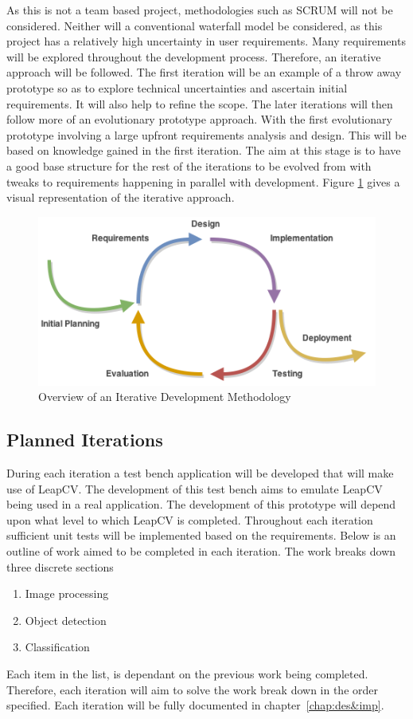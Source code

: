 \documentclass[11pt,oneside]{report}
\begin{document}
					As this is not a team based project, methodologies such as SCRUM will not be considered.
					Neither will a conventional waterfall model be considered, as this project has a relatively high uncertainty in user requirements.
					Many requirements will be explored throughout the development process.
					Therefore, an iterative approach will be followed.
					The first iteration will be an example of a throw away prototype so as to explore technical uncertainties and ascertain initial requirements.
					It will also help to refine the scope.
					The later iterations will then follow more of an evolutionary prototype approach.
					With the first evolutionary prototype involving a large upfront requirements analysis and design.
					This will be based on knowledge gained in the first iteration.
					The aim at this stage is to have a good base structure for the rest of the iterations to be evolved from with tweaks to requirements happening in parallel with development.
					Figure \ref{fig:iterative} gives a visual representation of the iterative approach.
					\begin{figure}[!h]
						\centering
					
    						\includegraphics[width=\textwidth]{iterative_development}
    						\caption{Overview of an Iterative Development Methodology {\label{fig:iterative}}}
					\end{figure}
			\subsection{Planned Iterations}
					During each iteration a test bench application will be developed that will make use of LeapCV.
					The development of this test bench aims to emulate LeapCV being used in a real application.
					The development of this prototype will depend upon what level to which LeapCV is completed.
					Throughout each iteration sufficient unit tests will be implemented based on the requirements.
					Below is an outline of work aimed to be completed in each iteration.
					The work breaks down three discrete sections
					\begin{enumerate}
						\item Image processing
						\item Object detection
						\item Classification
					\end{enumerate}
					Each item in the list, is dependant on the previous work being completed.	
					Therefore, each iteration will aim to solve the work break down in the order specified.
					Each iteration will be fully documented in chapter~\ref{chap:des&imp}.
\end{document}
